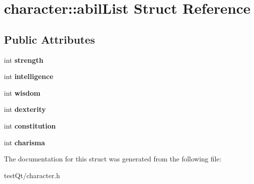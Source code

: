 \hypertarget{structcharacter_1_1abil_list}{}\section{character\+:\+:abil\+List Struct Reference}
\label{structcharacter_1_1abil_list}
\subsection*{Public Attributes}
\begin{DoxyCompactItemize}
\item 
\hypertarget{structcharacter_1_1abil_list_a47b62372951fd49c02cde454fdc54af3}{}\label{structcharacter_1_1abil_list_a47b62372951fd49c02cde454fdc54af3} 
int {\bfseries strength}
\item 
\hypertarget{structcharacter_1_1abil_list_a39aa5b2ebf613f1c16698b115fc8d94b}{}\label{structcharacter_1_1abil_list_a39aa5b2ebf613f1c16698b115fc8d94b} 
int {\bfseries intelligence}
\item 
\hypertarget{structcharacter_1_1abil_list_a5b7b5c1a7de429425cae26e56f7af95e}{}\label{structcharacter_1_1abil_list_a5b7b5c1a7de429425cae26e56f7af95e} 
int {\bfseries wisdom}
\item 
\hypertarget{structcharacter_1_1abil_list_aac36eb9c4f417f95004d000d88d763c4}{}\label{structcharacter_1_1abil_list_aac36eb9c4f417f95004d000d88d763c4} 
int {\bfseries dexterity}
\item 
\hypertarget{structcharacter_1_1abil_list_a96f3881abe36ac9cd08ea164c6078feb}{}\label{structcharacter_1_1abil_list_a96f3881abe36ac9cd08ea164c6078feb} 
int {\bfseries constitution}
\item 
\hypertarget{structcharacter_1_1abil_list_a19859232e9c642604134f73c61c3c797}{}\label{structcharacter_1_1abil_list_a19859232e9c642604134f73c61c3c797} 
int {\bfseries charisma}
\end{DoxyCompactItemize}


The documentation for this struct was generated from the following file\+:\begin{DoxyCompactItemize}
\item 
test\+Qt/character.\+h\end{DoxyCompactItemize}
